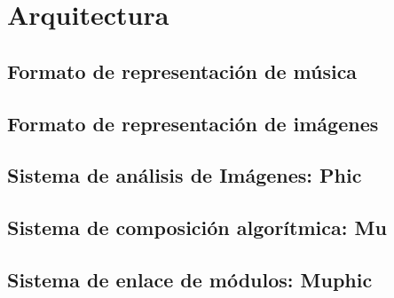 \section{Arquitectura}

\subsection{Formato de representación de música}


\subsection{Formato de representación de imágenes}


\subsection{Sistema de análisis de Imágenes: Phic}


\subsection{Sistema de composición algorítmica: Mu}


\subsection{Sistema de enlace de módulos: Muphic}


